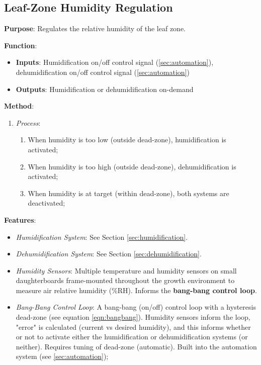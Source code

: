 \subsection{Leaf-Zone Humidity Regulation}
\label{sec:humidityregulation}

\textbf{Purpose}: Regulates the relative humidity of the leaf zone.

\textbf{Function}:
\begin{itemize}
    \item \textbf{Inputs}: Humidification on/off control signal (\ref{sec:automation}), dehumidification on/off control signal (\ref{sec:automation})
    \item \textbf{Outputs}: Humidification or dehumidification on-demand
\end{itemize}

\textbf{Method}:
\begin{enumerate}
    \item \textit{Process}:
    \begin{enumerate}
        \item When humidity is too low (outside dead-zone), humidification is activated;
        \item When humidity is too high (outside dead-zone), dehumidification is activated;
        \item When humidity is at target (within dead-zone), both systems are deactivated;
    \end{enumerate}
\end{enumerate}

\textbf{Features}:
\begin{itemize}
    \item \textit{Humidification System}: See Section \ref{sec:humidification}.
    \item \textit{Dehumidification System}: See Section \ref{sec:dehumidification}.
    \item \textit{Humidity Sensors}: Multiple temperature and humidity sensors \cite{sht31} on small daughterboards frame-mounted throughout the growth environment to measure air relative humidity (\%RH). Informs the \textbf{bang-bang control loop}.
    \item \textit{Bang-Bang Control Loop}: A bang-bang (on/off) control loop with a hysteresis dead-zone (see equation \ref{eqn:bangbang}). Humidity sensors inform the loop, "error" is calculated (current vs desired humidity), and this informs whether or not to activate either the humidification or dehumidification systems (or neither). Requires tuning of dead-zone (automatic). Built into the automation system (see \ref{sec:automation});
\end{itemize}

